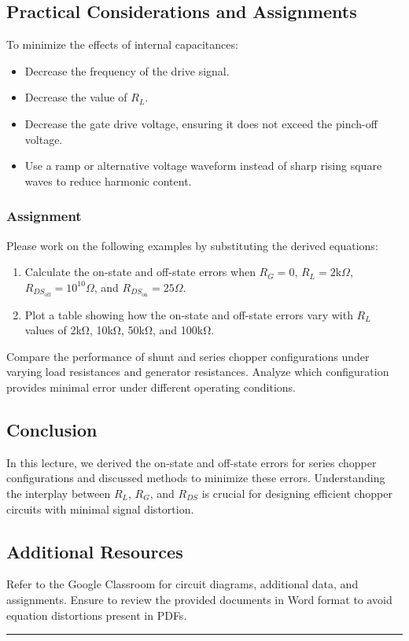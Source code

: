 \documentclass[a4paper,9pt,twoside,openany,twocolumn]{memoir}
\begin{document}
\subsection{Practical Considerations and Assignments}
To minimize the effects of internal capacitances:
\begin{itemize}
    \item Decrease the frequency of the drive signal.
    \item Decrease the value of \( R_L \).
    \item Decrease the gate drive voltage, ensuring it does not exceed the pinch-off voltage.
    \item Use a ramp or alternative voltage waveform instead of sharp rising square waves to reduce harmonic content.
\end{itemize}

\subsubsection{Assignment}
Please work on the following examples by substituting the derived equations:
\begin{enumerate}
    \item Calculate the on-state and off-state errors when \( R_G = 0 \), \( R_L = 2\text{k}\Omega \), \( R_{DS_{\text{off}}} = 10^{10}\Omega \), and \( R_{DS_{\text{on}}} = 25\Omega \).
    \item Plot a table showing how the on-state and off-state errors vary with \( R_L \) values of 2kΩ, 10kΩ, 50kΩ, and 100kΩ.
\end{enumerate}

Compare the performance of shunt and series chopper configurations under varying load resistances and generator resistances. Analyze which configuration provides minimal error under different operating conditions.

\subsection{Conclusion}
In this lecture, we derived the on-state and off-state errors for series chopper configurations and discussed methods to minimize these errors. Understanding the interplay between \( R_L \), \( R_G \), and \( R_{DS} \) is crucial for designing efficient chopper circuits with minimal signal distortion.

\subsection{Additional Resources}
Refer to the Google Classroom for circuit diagrams, additional data, and assignments. Ensure to review the provided documents in Word format to avoid equation distortions present in PDFs.
\begin{center}\rule{0.5\linewidth}{0.5pt}\end{center}
\end{document}
